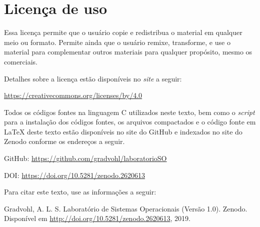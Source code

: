 \chapter*{Licença de uso}\label{chp:licenca}
\doclicenseThis

Essa licença permite que o usuário copie e redistribua o material em qualquer meio ou formato. Permite ainda que o usuário remixe, transforme, e use o material para complementar outros materiais para qualquer propósito, mesmo os comerciais.

 Detalhes sobre a licença estão disponíveis no \textit{site} a seguir:
 \begin{center}
    \url{https://creativecommons.org/licenses/by/4.0}     
 \end{center}

Todos os códigos fontes na linguagem C utilizados neste texto, bem como o \textit{script} para a instalação dos códigos fontes, os arquivos compactados e o código fonte em \LaTeX{} deste texto estão disponíveis no site do GitHub e indexados no site do Zenodo conforme os endereços a seguir.

GitHub: \url{https://github.com/gradvohl/laboratorioSO}

DOI: \url{https://doi.org/10.5281/zenodo.2620613}

Para citar este texto, use as informações a seguir:

\noindent
{\sc Gradvohl, A. L. S.} Laboratório de Sistemas Operacionais (Versão 1.0). Zenodo. Disponível em \url{http://doi.org/10.5281/zenodo.2620613}, 2019.
